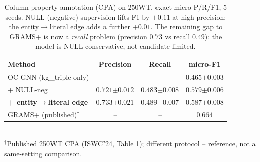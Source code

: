 \begin{table}[t]
\centering
\caption{Column-property annotation (CPA) on 250WT, exact micro P/R/F1, 5 seeds.
NULL (negative) supervision lifts F1 by $+0.11$ at high precision; the
entity$\to$literal edge adds a further $+0.01$. The remaining gap to GRAMS+ is now
a \emph{recall} problem (precision $0.73$ vs recall $0.49$): the model is
NULL-conservative, not candidate-limited.}
\label{tab:cpa-250wt}
\begin{tabular}{lccc}
\toprule
Method & Precision & Recall & micro-F1 \\
\midrule
OC-GNN (kg\_triple only)            & --    & --    & $0.465{\scriptstyle\pm0.003}$ \\
\quad + NULL-neg                    & $0.721{\scriptstyle\pm0.012}$ & $0.483{\scriptstyle\pm0.008}$ & $0.579{\scriptstyle\pm0.006}$ \\
\quad\textbf{+ entity$\to$literal edge} & $0.733{\scriptstyle\pm0.021}$ & $0.489{\scriptstyle\pm0.007}$ & $\mathbf{0.587}{\scriptstyle\pm0.008}$ \\
\midrule
GRAMS+ (published)$^{\dagger}$      & --    & --    & 0.664 \\
\bottomrule
\end{tabular}
\\[2pt]
{\footnotesize $^{\dagger}$Published 250WT CPA (ISWC'24, Table 1); different
protocol -- reference, not a same-setting comparison.}
\end{table}
